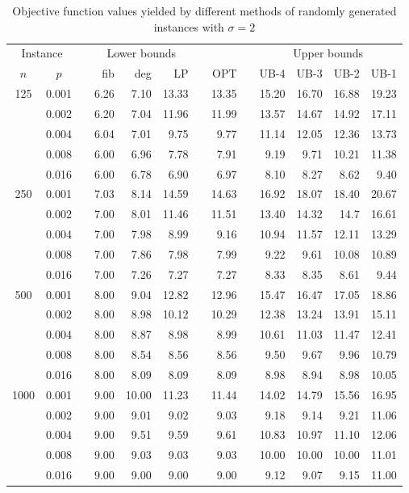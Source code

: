 \begin{table}[]
\centering
\begin{tabular}{ccrrrrrrrrrrr}
\multicolumn{2}{c}{Instance} & &\multicolumn{3}{c}{Lower bounds} & & & &\multicolumn{4}{c}{Upper bounds} \\
\cline{1-2}\cline{4-6}\cline{10-13}
$n$ & $p$  &   & fib  & deg  & LP  &  & OPT & & UB-4  & UB-3  & UB-2  & UB-1  \\
\hline
\multirow{5}{*}{125} 
& 0.001 && 6.26 & 7.10 & 13.33 && 13.35 && 15.20 & 16.70 & 16.88 & 19.23 \\
& 0.002 && 6.20 & 7.04 & 11.96 && 11.99 && 13.57 & 14.67 & 14.92 & 17.11 \\
& 0.004 && 6.04 & 7.01 & 9.75  && 9.77  && 11.14 & 12.05 & 12.36 & 13.73 \\
& 0.008 && 6.00 & 6.96 & 7.78  && 7.91  && 9.19  & 9.71  & 10.21 & 11.38 \\
& 0.016 && 6.00 & 6.78 & 6.90  && 6.97  && 8.10  & 8.27  & 8.62  & 9.40  \\
\hline
\multirow{5}{*}{250} 
& 0.001 && 7.03 & 8.14 & 14.59 && 14.63 && 16.92 & 18.07 & 18.40 & 20.67 \\
& 0.002 && 7.00 & 8.01 & 11.46 && 11.51 && 13.40 & 14.32 & 14.7  & 16.61 \\
& 0.004 && 7.00 & 7.98 & 8.99  && 9.16  && 10.94 & 11.57 & 12.11 & 13.29 \\
& 0.008 && 7.00 & 7.86 & 7.98  && 7.99  && 9.22  & 9.61  & 10.08 & 10.89 \\
& 0.016 && 7.00 & 7.26 & 7.27  && 7.27  && 8.33  & 8.35  & 8.61  & 9.44  \\
\hline
\multirow{5}{*}{500} 
& 0.001 && 8.00 & 9.04 & 12.82 &&12.96  &&15.47  & 16.47 & 17.05 & 18.86 \\
& 0.002 && 8.00 & 8.98 & 10.12 &&10.29  &&12.38  & 13.24 & 13.91 & 15.11 \\
& 0.004 && 8.00 & 8.87 & 8.98  &&8.99   &&10.61  & 11.03 & 11.47 & 12.41 \\
& 0.008 && 8.00 & 8.54 & 8.56  &&8.56   &&9.50   & 9.67  & 9.96  & 10.79 \\
& 0.016 && 8.00 & 8.09 & 8.09  &&8.09   &&8.98   & 8.94  & 8.98  & 10.05 \\
\hline
\multirow{5}{*}{1000} 
& 0.001 && 9.00 & 10.00 & 11.23 && 11.44 && 14.02 & 14.79 & 15.56 & 16.95 \\
& 0.002 && 9.00 & 9.01  & 9.02  && 9.03  && 9.18  & 9.14  & 9.21  & 11.06 \\
& 0.004 && 9.00 & 9.51  & 9.59  && 9.61  && 10.83 & 10.97 & 11.10 & 12.06 \\
& 0.008 && 9.00 & 9.03  & 9.03  && 9.03  && 10.00 & 10.00 & 10.00 & 11.01 \\
& 0.016 && 9.00 & 9.00  & 9.00  && 9.00  && 9.12  & 9.07  & 9.15  & 11.00 \\
\end{tabular}
\caption{Objective function values yielded by different methods of randomly generated instances with $\sigma=2$}
\label{tab:obj-s2}
\end{table}

